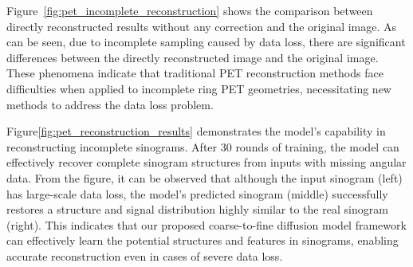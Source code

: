 \documentclass[
reprint,
superscriptaddress,
nofootinbib,
amsmath,amssymb,
aps,
prd,
]{revtex4-2}
\begin{document}
Figure~\ref{fig:pet_incomplete_reconstruction} shows the comparison between directly reconstructed results without any correction and the original image. As can be seen, due to incomplete sampling caused by data loss, there are significant differences between the directly reconstructed image and the original image. These phenomena indicate that traditional PET reconstruction methods face difficulties when applied to incomplete ring PET geometries, necessitating new methods to address the data loss problem.

Figure\ref{fig:pet_reconstruction_results} demonstrates the model's capability in reconstructing incomplete sinograms. After 30 rounds of training, the model can effectively recover complete sinogram structures from inputs with missing angular data. From the figure, it can be observed that although the input sinogram (left) has large-scale data loss, the model's predicted sinogram (middle) successfully restores a structure and signal distribution highly similar to the real sinogram (right). This indicates that our proposed coarse-to-fine diffusion model framework can effectively learn the potential structures and features in sinograms, enabling accurate reconstruction even in cases of severe data loss.
\end{document}
